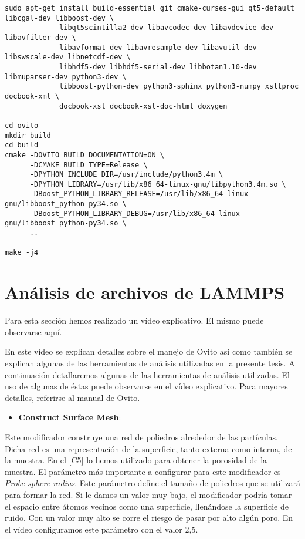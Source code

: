 \begin{lstlisting}
sudo apt-get install build-essential git cmake-curses-gui qt5-default libcgal-dev libboost-dev \
		     libqt5scintilla2-dev libavcodec-dev libavdevice-dev libavfilter-dev \
		     libavformat-dev libavresample-dev libavutil-dev libswscale-dev libnetcdf-dev \
		     libhdf5-dev libhdf5-serial-dev libbotan1.10-dev libmuparser-dev python3-dev \
		     libboost-python-dev python3-sphinx python3-numpy xsltproc docbook-xml \
		     docbook-xsl docbook-xsl-doc-html doxygen
                     
cd ovito
mkdir build
cd build
cmake -DOVITO_BUILD_DOCUMENTATION=ON \
      -DCMAKE_BUILD_TYPE=Release \
      -DPYTHON_INCLUDE_DIR=/usr/include/python3.4m \
      -DPYTHON_LIBRARY=/usr/lib/x86_64-linux-gnu/libpython3.4m.so \
      -DBoost_PYTHON_LIBRARY_RELEASE=/usr/lib/x86_64-linux-gnu/libboost_python-py34.so \
      -DBoost_PYTHON_LIBRARY_DEBUG=/usr/lib/x86_64-linux-gnu/libboost_python-py34.so \
      ..
      
make -j4
\end{lstlisting}

\section{Análisis de archivos de LAMMPS}
\label{AB_2}

Para esta sección hemos realizado un vídeo explicativo. El mismo puede observarse \href{https://youtu.be/iGieWcpcQmQ}{aquí}.

En este vídeo se explican detalles sobre el manejo de Ovito así como también se explican algunas de las herramientas de análisis utilizadas en la presente tesis. A continuación detallaremos algunas de las herramientas de análisis utilizadas. El uso de algunas de éstas puede observarse en el vídeo explicativo. Para mayores detalles, referirse al \href{http://www.ovito.org/manual/particles.modifiers.html}{manual de Ovito}.

\begin{itemize}
 \item \textbf{Construct Surface Mesh}:
\end{itemize}
Este modificador construye una red de poliedros alrededor de las partículas. Dicha red es una representación de la superficie, tanto externa como interna, de la muestra. En el \cref{C5} lo hemos utilizado para obtener la porosidad de la muestra. El parámetro más importante a configurar para este modificador es \textit{Probe sphere radius}. Este parámetro define el tamaño de poliedros que se utilizará para formar la red. Si le damos un valor muy bajo, el modificador podría tomar el espacio entre átomos vecinos como una superficie, llenándose la superficie de ruido. Con un valor muy alto se corre el riesgo de pasar por alto algún poro. En el vídeo configuramos este parámetro con el valor 2,5.

